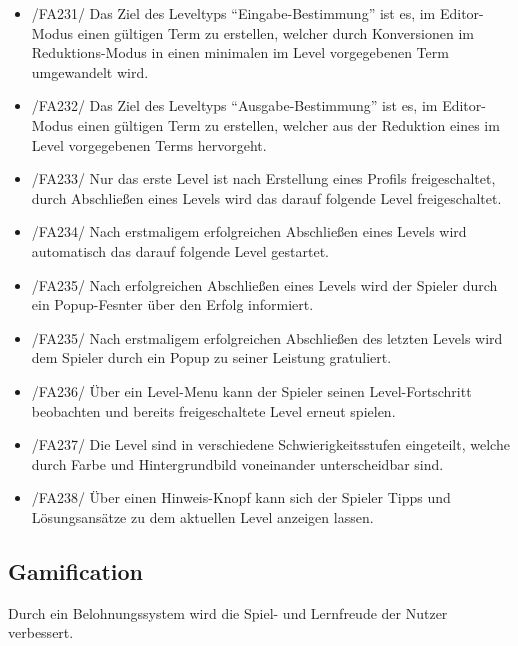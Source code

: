 \begin{itemize}
\item /FA231/ Das Ziel des Leveltyps "`Eingabe-Bestimmung"' ist es, im Editor-Modus einen gültigen Term zu erstellen, welcher durch Konversionen im Reduktions-Modus in einen minimalen im Level vorgegebenen Term umgewandelt wird.
\item /FA232/ Das Ziel des Leveltyps "`Ausgabe-Bestimmung"' ist es, im Editor-Modus einen gültigen Term zu erstellen, welcher aus der Reduktion eines im Level vorgegebenen Terms hervorgeht.
\item /FA233/ Nur das erste Level ist nach Erstellung eines Profils freigeschaltet, durch Abschließen eines Levels wird das darauf folgende Level freigeschaltet.
\item /FA234/ Nach erstmaligem erfolgreichen Abschließen eines Levels wird automatisch das darauf folgende Level gestartet.
\item /FA235/ Nach erfolgreichen Abschließen eines Levels wird der Spieler durch ein Popup-Fesnter über den Erfolg informiert.
\item /FA235/ Nach erstmaligem erfolgreichen Abschließen des letzten Levels wird dem Spieler durch ein Popup zu seiner Leistung gratuliert.
\item /FA236/ Über ein Level-Menu kann der Spieler seinen Level-Fortschritt beobachten und bereits freigeschaltete Level erneut spielen.
\item /FA237/ Die Level sind in verschiedene Schwierigkeitsstufen eingeteilt, welche durch Farbe und Hintergrundbild voneinander unterscheidbar sind.
\item /FA238/ Über einen Hinweis-Knopf kann sich der Spieler Tipps und Lösungsansätze zu dem aktuellen Level anzeigen lassen.
\end{itemize}

\subsection{Gamification}

Durch ein Belohnungssystem wird die Spiel- und Lernfreude der Nutzer verbessert.

